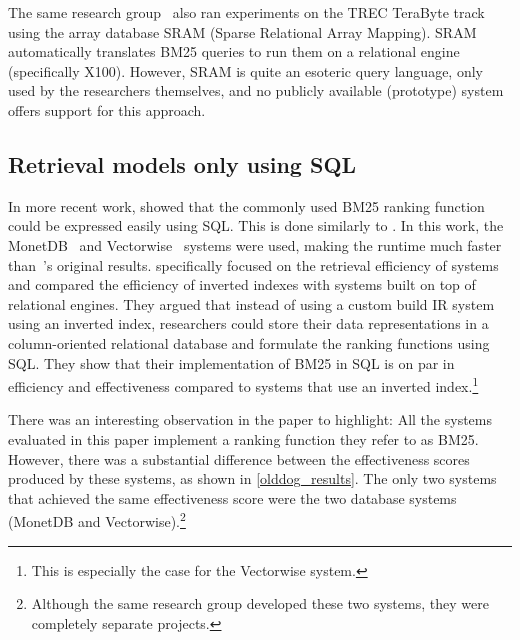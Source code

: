 The same research group~\citep{array-db} also ran experiments on the TREC TeraByte track using the array database SRAM (Sparse Relational Array Mapping). SRAM automatically translates BM25 queries to run them on a relational engine (specifically X100). However, SRAM is quite an esoteric query language, only used by the researchers themselves, and no publicly available (prototype) system offers support for this approach. 

\subsection{Retrieval models only using SQL}
In more recent work, \citet{OldDog} showed that the commonly used BM25 ranking function could be expressed easily using SQL. This is done similarly to \citet{PowerDB-IR}. In this work, the MonetDB~\citep{monet} and Vectorwise~\citep{vectorwise} systems were used, making the runtime much faster than~\citeauthor{PowerDB-IR}'s original results.  specifically focused on the retrieval efficiency of systems and compared the efficiency of inverted indexes with systems built on top of relational engines. They argued that instead of using a custom build IR system using an inverted index, researchers could store their data representations in a column-oriented relational database and formulate the ranking functions using SQL. They show that their implementation of BM25 in SQL is on par in efficiency and effectiveness compared to systems that use an inverted index.\footnote{This is especially the case for the Vectorwise system.}  

There was an interesting observation in the paper to highlight: All the systems evaluated in this paper implement a ranking function they refer to as BM25. However, there was a substantial difference between the effectiveness scores produced by these systems, as shown in \cref{olddog_results}. The only two systems that achieved the same effectiveness score were the two database systems (MonetDB and Vectorwise).\footnote{Although the same research group developed these two systems, they were completely separate projects.}

